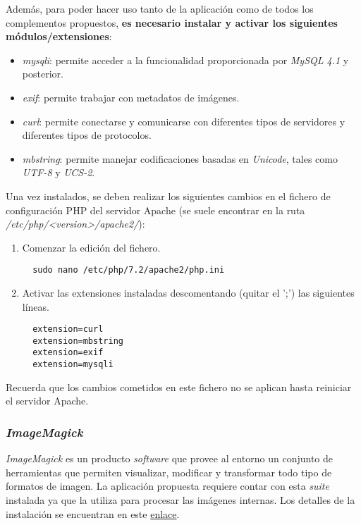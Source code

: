 Además, para poder hacer uso tanto de la aplicación como de todos los
complementos propuestos, \textbf{es necesario instalar y activar los
siguientes módulos/extensiones}:

\begin{itemize}
\tightlist
\item
  \emph{mysqli}: permite acceder a la funcionalidad proporcionada por
  \emph{MySQL 4.1} y posterior.
\item
  \emph{exif}: permite trabajar con metadatos de imágenes.
\item
  \emph{curl}: permite conectarse y comunicarse con diferentes tipos de
  servidores y diferentes tipos de protocolos.
\item
  \emph{mbstring}: permite manejar codificaciones basadas en
  \emph{Unicode}, tales como \emph{UTF-8} y \emph{UCS-2}.
\end{itemize}

Una vez instalados, se deben realizar los siguientes cambios en el
fichero de configuración PHP del servidor Apache (se suele encontrar en
la ruta \emph{/etc/php/\textless version\textgreater/apache2/}):

\begin{enumerate}
\def\labelenumi{\arabic{enumi}.}
\tightlist
\item
  Comenzar la edición del fichero.
  \begin{verbatim}
  sudo nano /etc/php/7.2/apache2/php.ini
  \end{verbatim}
\item
  Activar las extensiones instaladas descomentando (quitar el ';') las
  siguientes líneas.
  \begin{verbatim}
  extension=curl
  extension=mbstring
  extension=exif
  extension=mysqli
  \end{verbatim}
\end{enumerate}

Recuerda que los cambios cometidos en este fichero no se aplican hasta
reiniciar el servidor Apache.

\subsubsection{\emph{ImageMagick}}

\emph{ImageMagick} es un producto \emph{software} que provee al entorno
un conjunto de herramientas que permiten visualizar, modificar y
transformar todo tipo de formatos de imagen. La aplicación propuesta
requiere contar con esta \emph{suite} instalada ya que la utiliza para
procesar las imágenes internas. Los detalles de la instalación se
encuentran en este
\href{https://imagemagick.org/script/install-source.php}{enlace}.

